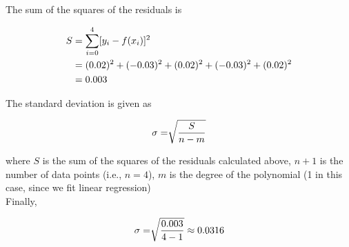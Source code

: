 \documentclass[12pt]{article}
\begin{document}
The sum of the squares of the residuals is

\begin{align}
  \notag
  S&=\sum\limits_{i=0}^4 [y_i-f(x_i)]^2\\
  \notag
  &=(0.02)^2 + (-0.03)^2 + (0.02)^2 + (-0.03)^2 + (0.02)^2\\
  \notag
  &=0.003
\end{align}

The standard deviation is given as

\begin{align}
  \notag
  \sigma=\sqrt[]{\frac{S}{n-m}}
\end{align}

where $S$ is the sum of the squares of the residuals calculated above, $n + 1$ is the number of data points (i.e., $n = 4$), $m$ is the degree of the polynomial (1 in this case, since we fit linear regression)\\

Finally,

\begin{align}
  \notag
  \sigma=\sqrt[]{\frac{0.003}{4-1}} \approx 0.0316
\end{align}
\end{document}
